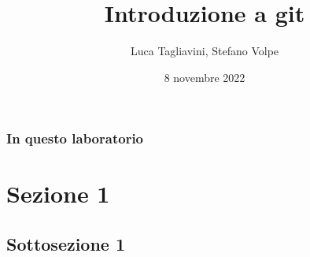 \documentclass{beamer}
\title{Introduzione a git}
\author{Luca Tagliavini, Stefano Volpe}
\institute{Università di Bologna, corso di Laurea in Informatica}
\date{8 novembre 2022}
\begin{document}
\frame{\titlepage}

\begin{frame}
  \frametitle{In questo laboratorio}
  \tableofcontents
\end{frame}

\section{Sezione 1}

\subsection{Sottosezione 1}
\begin{frame}
  \frametitle{}
\end{frame}
\end{document}

